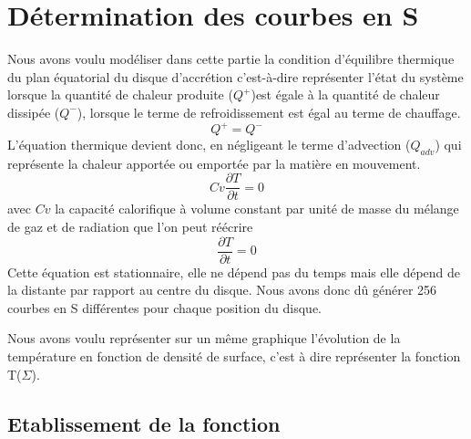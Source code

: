\section{Détermination des courbes en S}

Nous avons voulu modéliser dans cette partie la condition d'équilibre thermique du plan équatorial du disque d'accrétion c'est-à-dire représenter l'état du système lorsque la quantité de chaleur produite ($Q^+$)est égale à la quantité de chaleur dissipée ($Q^-$), lorsque le terme de refroidissement est égal au terme de chauffage.
\begin{equation}
Q^+ = Q^-
\end{equation}
L'équation thermique devient donc, en négligeant le terme d'advection ($Q_{adv}$) qui représente la chaleur apportée ou emportée par la matière en mouvement.
\begin{equation}
Cv\frac{\partial T}{\partial t} = 0
\end{equation}
avec $Cv$ la capacité calorifique à volume constant par unité de masse du mélange de gaz et de radiation que l'on peut réécrire
\begin{equation}
\frac{\partial T}{\partial t} = 0
\end{equation}
Cette équation est stationnaire, elle ne dépend pas du temps mais elle dépend de la distante par rapport au centre du disque. Nous avons donc dû générer 256 courbes en S différentes pour chaque position du disque.

Nous avons voulu représenter sur un même graphique l'évolution de la température en fonction de densité de surface, c'est à dire représenter la fonction T($\Sigma$).
\\   

\subsection{Etablissement de la fonction}

